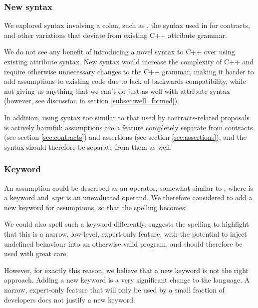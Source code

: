\subsubsection{New syntax}

We explored syntax involving a colon, such as , the syntax used in \cite{P0542R5} for contracts, and other variations that deviate from existing C++ attribute grammar. 

We do not see any benefit of introducing a novel syntax to C++ over using existing attribute syntax. New syntax would increase the complexity of C++ and require otherwise unnecessary changes to the C++ grammar, making it harder to add assumptions to existing code due to lack of backwards-compatibility, while not giving us anything that we can't do just as well with attribute syntax (however, see discussion in section \ref{subsec:well_formed}).

In addition, using syntax too similar to that used by contracts-related proposals is actively harmful: assumptions are a feature completely separate from contracts (see section \ref{sec:contracts}) and assertions (see section \ref{sec:assertions}), and the syntax should therefore be separate from them as well.

\subsubsection{Keyword}

An assumption could be described as an operator, somewhat similar to , where  is a keyword and \emph{expr} is an unevaluated operand. We therefore considered to add a new keyword for assumptions, so that the spelling becomes:

\forceindent
{}

We could also spell such a keyword differently. \cite{P2064R0} suggests the spelling  to highlight that this is a narrow, low-level, expert-only feature, with the potential to inject undefined behaviour into an otherwise valid program, and should therefore be used with great care.

However, for exactly this reason, we believe that a new keyword is not the right approach. Adding a new keyword is a very significant change to the language. A narrow, expert-only feature that will only be used by a small fraction of developers does not justify a new keyword.


